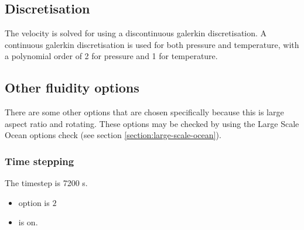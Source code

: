 \subsection{Discretisation}

The velocity is solved for using a discontinuous galerkin discretisation. A continuous galerkin discretisation is used for both pressure and temperature, with a polynomial order of 2 for pressure and 1 for temperature. 

\subsection{Other fluidity options}

There are some other options that are chosen specifically because this is large aspect ratio and rotating. These options may be checked by using the Large Scale Ocean options check (see section \ref{section:large-scale-ocean}).

\subsubsection{Time stepping}
The timestep is 7200 s. 
\begin{itemize}
\item {} option is $2$ 
\item {} is on.
\end{itemize}

